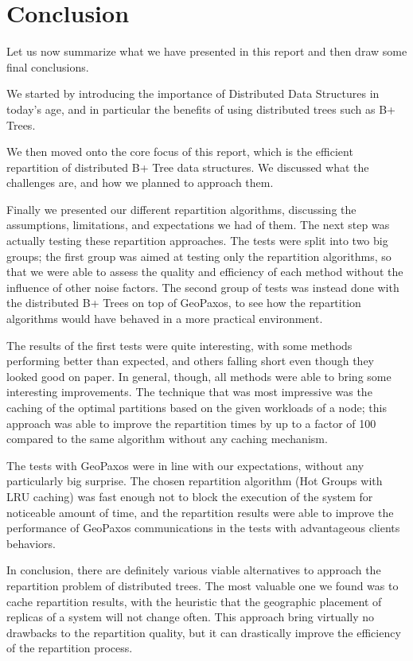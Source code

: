 \chapter{Conclusion}\label{sec:Conclusion}
Let us now summarize what we have presented in this report and then draw some final conclusions.

We started by introducing the importance of Distributed Data Structures in today's age, and in particular the benefits of using distributed trees such as B+ Trees. 

We then moved onto the core focus of this report, which is the efficient repartition of distributed B+ Tree data structures. We discussed what the challenges are, and how we planned to approach them.

Finally we presented our different repartition algorithms, discussing the assumptions, limitations, and expectations we had of them. The next step was actually testing these repartition approaches. The tests were split into two big groups; the first group was aimed at testing only the repartition algorithms, so that we were able to assess the quality and efficiency of each method without the influence of other noise factors. The second group of tests was instead done with the distributed B+ Trees on top of GeoPaxos, to see how the repartition algorithms would have behaved in a more practical environment.

The results of the first tests were quite interesting, with some methods performing better than expected, and others falling short even though they looked good on paper. In general, though, all methods were able to bring some interesting improvements. The technique that was most impressive was the caching of the optimal partitions based on the given workloads of a node; this approach was able to improve the repartition times by up to a factor of 100 compared to the same algorithm without any caching mechanism. 

The tests with GeoPaxos were in line with our expectations, without any particularly big surprise. The chosen repartition algorithm (Hot Groups with LRU caching) was fast enough not to block the execution of the system for noticeable amount of time, and the repartition results were able to improve the performance of GeoPaxos communications in the tests with advantageous clients behaviors.

In conclusion, there are definitely various viable alternatives to approach the repartition problem of distributed trees. The most valuable one we found was to cache repartition results, with the heuristic that the geographic placement of replicas of a system will not change often. This approach bring virtually no drawbacks to the repartition quality, but it can drastically improve the efficiency of the repartition process.

